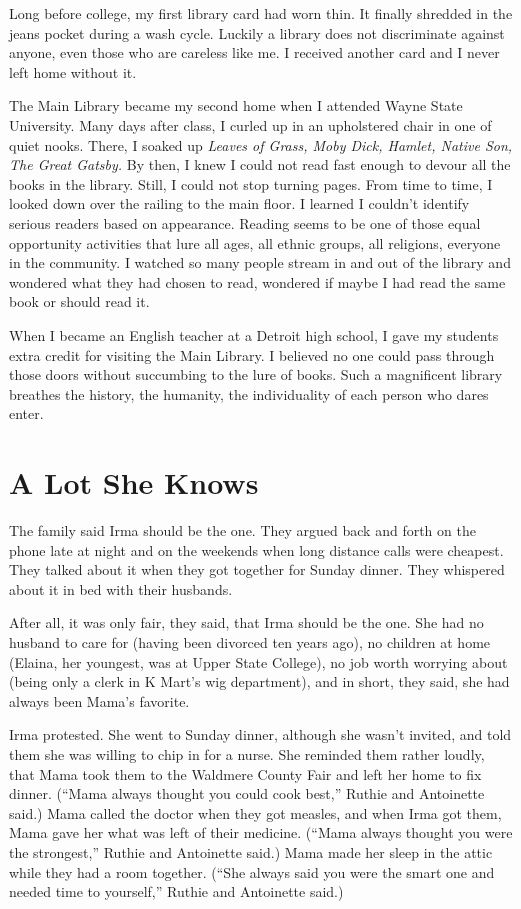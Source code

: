 \documentclass[twoside,10pt]{book}
\begin{document}
Long before college, my first library card had worn thin. It finally
shredded in the jeans pocket during a wash cycle. Luckily a library does
not discriminate against anyone, even those who are care­less like me. I
received another card and I never left home without it.

The Main Library became my second home when I attended Wayne State
University. Many days after class, I curled up in an upholstered chair
in one of quiet nooks. There, I soaked up \emph{Leaves of Grass, Moby
Dick, Hamlet, Native Son, The Great Gatsby.} By then, I knew I could not
read fast enough to devour all the books in the library. Still, I could
not stop turning pages. From time to time, I looked down over the
railing to the main floor. I learned I couldn't identify serious readers
based on appearance. Reading seems to be one of those equal opportunity
activities that lure all ages, all ethnic groups, all religions,
everyone in the community. I watched so many people stream in and out of
the library and wondered what they had chosen to read, wondered if maybe
I had read the same book or should read it.

When I became an English teacher at a Detroit high school, I gave my
students extra credit for visiting the Main Library. I believed no one
could pass through those doors without succumbing to the lure of books.
Such a magnificent library breathes the history, the humanity, the
individuality of each person who dares enter.



\cleardoublepage
\chapter{A Lot She Knows}

The family said Irma should be the one. They argued back and forth on
the phone late at night and on the weekends when long distance calls
were cheapest. They talked about it when they got together for Sunday
dinner. They whispered about it in bed with their husbands.

After all, it was only fair, they said, that Irma should be the one. She
had no husband to care for (having been divorced ten years ago), no
children at home (Elaina, her youngest, was at Upper State College), no
job worth worrying about (being only a clerk in K Mart's wig
department), and in short, they said, she had always been Mama's
favorite.

Irma protested. She went to Sunday dinner, although she wasn't invited,
and told them she was willing to chip in for a nurse. She reminded them
rather loudly, that Mama took them to the Waldmere County Fair and left
her home to fix dinner. (``Mama always thought you could cook best,''
Ruthie and Antoinette said.) Mama called the doctor when they got
measles, and when Irma got them, Mama gave her what was left of their
medicine. (``Mama always thought you were the strongest,'' Ruthie and
Antoinette said.) Mama made her sleep in the attic while they had a room
together. (``She always said you were the smart one and needed time to
yourself,'' Ruthie and Antoinette said.)
\end{document}
